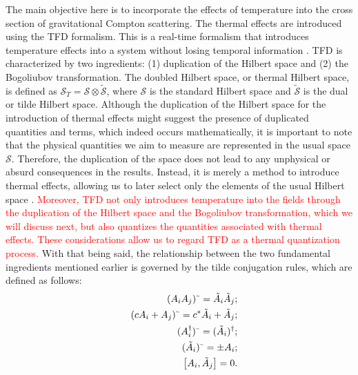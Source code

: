 \documentclass[11pt,showpacs,preprintnumbers,amsmath,amssymb,prd,nofootinbib,superscriptaddress]{revtex4-2}
\newcommand{\til}{\text{\textasciitilde}}
\begin{document}
The main objective here is to incorporate the effects of temperature into the cross section of gravitational Compton scattering. The thermal effects are introduced using the TFD formalism. This is a real-time formalism that introduces temperature effects into a system without losing temporal information \cite{Umezawa1, Umezawa2, Book, Umezawa22, Khanna1, Khanna2, Santana1, Santana2}. TFD is characterized by two ingredients: (1) duplication of the Hilbert space and (2) the Bogoliubov transformation. The doubled Hilbert space, or thermal Hilbert space, is defined as $\mathcal{S}_T = \mathcal{S} \otimes \tilde{\mathcal{S}}$, where $\mathcal{S}$ is the standard Hilbert space and $\tilde{\mathcal{S}}$ is the dual or tilde Hilbert space. Although the duplication of the Hilbert space for the introduction of thermal effects might suggest the presence of duplicated quantities and terms, which indeed occurs mathematically, it is important to note that the physical quantities we aim to measure are represented in the usual space $\mathcal{S}$. Therefore, the duplication of the space does not lead to any unphysical or absurd consequences in the results. Instead, it is merely a method to introduce thermal effects, allowing us to later select only the elements of the usual Hilbert space \cite{Book, das2023finite}. \textcolor{red}{Moreover, TFD not only introduces temperature into the fields through the duplication of the Hilbert space and the Bogoliubov transformation, which we will discuss next, but also quantizes the quantities associated with thermal effects. These considerations allow us to regard TFD as a thermal quantization process.} With that being said, the relationship between the two fundamental ingredients mentioned earlier is governed by the tilde conjugation rules, which are defined as follows:
\begin{eqnarray}
    &&(A_iA_j)^\til=\Tilde{A}_i\Tilde{A}_j;\nonumber\\
    &&(cA_i+A_j)^\til=c^*\Tilde{A}_i+\Tilde{A}_j;\nonumber\\
    &&(A_i^\dagger)^\til=(\Tilde{A}_i)^\dagger;\\
    &&(\Tilde{A}_i)^\til=\pm A_i;\nonumber\\
   &&\comm{A_i}{\Tilde{A}_j}=0.\nonumber\label{operator}
\end{eqnarray}	
\end{document}
